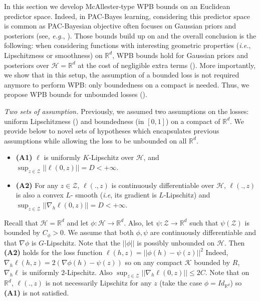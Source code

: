 In this section we develop McAllester-type WPB bounds on an Euclidean predictor space. Indeed, in PAC-Bayes learning, considering this predictor space is common as PAC-Bayesian objective often focuses on Gaussian priors and posteriors (see, \emph{e.g.}, \citealp{dziugaite2017computing,amit2018meta}).
Those bounds build up on  and the overall conclusion is the following: when considering functions with interesting geometric properties (\emph{i.e.}, Lipschitzness or smoothness) on $\mathbb{R}^d$, WPB bounds hold for Gaussian priors and posteriors over $\mathcal{H}= \mathbb{R}^d$ at the cost of negligible extra terms ().
More importantly, we show that in this setup, the assumption of a bounded loss is not required anymore to perform WPB: only boundedness on a compact is needed. Thus, we propose WPB bounds for unbounded losses ().

\textit{Two sets of assumption.} Previously, we assumed two assumptions on the losses: uniform Lipschitzness () and boundedness (in $[0,1]$) on a compact of $\mathbb{R}^d$. We provide below to novel sets of hypotheses which encapsulates previous assumptions while allowing the loss to be unbounded on all $\mathbb{R}^d$.
\begin{itemize}
  \item \textbf{(A1)} $\ell$ is uniformly $K$-Lipschitz over  $\mathcal{H}$, and $\sup_{z\in\mathcal{Z}} || \ell(0,z)|| =D< +\infty.$
  \item \textbf{(A2)} For any $z\in\mathcal{Z}$, $\ell(.,z)$ is continuously differentiable over $\mathcal{H}$, $\ell(.,z)$ is also a convex $L$- smooth (\emph{i.e}, its gradient is $L$-Lipschitz) and $\sup_{z\in\mathcal{Z}} ||\nabla_h \ell(0,z)|| =D< +\infty$.
\end{itemize}
\begin{example}
Recall that $\mathcal{H}=\mathbb{R}^d$ and let $\phi:\mathcal{H}\rightarrow \mathbb{R}^d$.
Also, let $\psi :\mathcal{Z}\rightarrow \mathbb{R}^d$ such that $\psi(\mathcal{Z})$ is bounded by $C_\phi >0$. We assume that both $\phi,\psi$ are continuously differentiable and that $\nabla\phi$ is $G$-Lipschitz.
Note that the $||\phi||$ is possibly unbounded on $\mathcal{H}$.
Then \textbf{(A2)} holds for the loss function $\ell(h,z)= ||\phi(h)-\psi(z)||^2$
Indeed, $\nabla_h \ell(h,z)= 2(\nabla\phi (h) -\psi(z))$ so on any compact $\mathcal{K}$ bounded by $R$, $\nabla_h \ell$ is uniformly $2$-Lipschitz. Also $\sup_{z\in\mathcal{Z}} ||\nabla_h \ell(0,z)|| \leq 2C$.
Note that on $\mathbb{R}^d$, $\ell(.,z)$ is not necessarily Lipschitz for any $z$ (take the case $\phi= Id_{\mathbb{R}^d}$) so \textbf{(A1)} is not satisfied.
\end{example}


